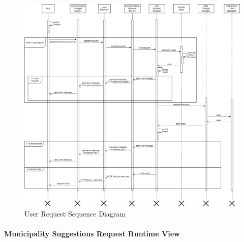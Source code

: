 \documentclass[titlepage]{article}
\begin{document}
\begin{figure}[h]
	\includegraphics[scale=0.387]{Diagrams/Sequence Diagrams/Runtime View Diagram user request.png}
	\caption{User Request Sequence Diagram}
\end{figure}
\FloatBarrier


\paragraph{Municipality Suggestions Request Runtime View\\}
\end{document}
